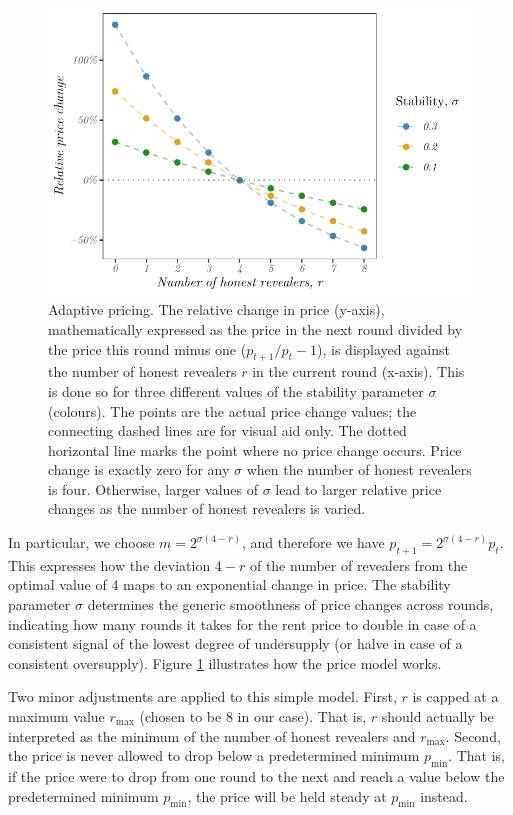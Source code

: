 \begin{figure}[!ht]
  \centering
  \includegraphics[width=.7\textwidth]{fig/adaptive-pricing.pdf}
  \caption[Adaptive pricing]{Adaptive pricing. The relative change in price (y-axis), mathematically expressed as the price in the next round divided by the price this round minus one ($p_{t+1} / p_t - 1$), is displayed against the number of honest revealers $r$ in the current round (x-axis). This is done so for three different values of the stability parameter $\sigma$ (colours). The points are the actual price change values; the connecting dashed lines are for visual aid only. The dotted horizontal line marks the point where no price change occurs. Price change is exactly zero for any $\sigma$ when the number of honest revealers is four. Otherwise, larger values of $\sigma$ lead to larger relative price changes as the number of honest revealers is varied.}
  \label{fig:adaptive-pricing}
\end{figure}

In particular, we choose $m = 2^{\sigma(4 - r)}$, and therefore we have $p_{t+1} = 2^{\sigma(4 - r)} p_t$. This expresses how the deviation $4 - r$ of the number of revealers from the optimal value of 4 maps to an exponential change in price. The stability parameter $\sigma$ determines the generic smoothness of price changes across rounds, indicating how many rounds it takes for the rent price to double in case of a consistent signal of the lowest degree of undersupply (or halve in case of a consistent oversupply). Figure \ref{fig:adaptive-pricing} illustrates how the price model works.

Two minor adjustments are applied to this simple model. First, $r$ is capped at a maximum value $r_{\text{max}}$ (chosen to be 8 in our case). That is, $r$ should actually be interpreted as the minimum of the number of honest revealers and $r_{\text{max}}$. Second, the price is never allowed to drop below a predetermined minimum $p_{\text{min}}$. That is, if the price were to drop from one round to the next and reach a value below the predetermined minimum $p_{\text{min}}$, the price will be held steady at $p_{\text{min}}$ instead. 

